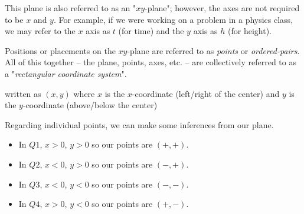 \documentclass[addpoints,12pt]{exam}
\theoremstyle{definition}
\theoremstyle{break}
\theoremstyle{break}
\begin{document}
\noindent This plane is also referred to as an "$xy$-plane"; however, the axes are not required to be $x$ and $y$. For example, if we were working on a problem in a physics class, we may refer to the $x$ axis as $t$ (for time) and the $y$ axis as $h$ (for height).

\noindent Positions or placements on the $xy$-plane are referred to as \emph{points} or \emph{ordered-pairs}. All of this together -- the plane, points, axes, etc. -- are collectively referred to as a "\emph{rectangular coordinate system}".

\newpage

\begin{definition}[Point]
written as $(x,y)$ where $x$ is the $x$-coordinate (left/right of the center) and $y$ is the $y$-coordinate (above/below the center)
\end{definition}

\vspace{.15in}

\noindent Regarding individual points, we can make some inferences from our plane.
\begin{itemize}
\item In $Q1$, $x>0$, $y>0$ so our points are $(+,+)$.
\item In $Q2$, $x<0$, $y>0$ so our points are $(-,+)$.
\item In $Q3$, $x<0$, $y<0$ so our points are $(-,-)$.
\item In $Q4$, $x>0$, $y<0$ so our points are $(+,-)$.
\end{itemize}

\vspace{.15in}
\end{document}
